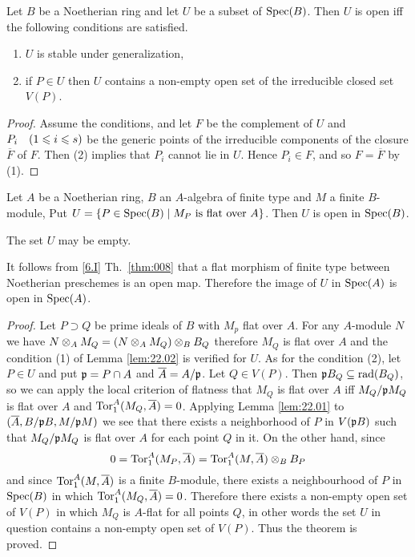 \documentclass[../main]{subfiles}
\begin{document}
\begin{parlemma}
\label{lem:22.02}
    Let $B$ be a Noetherian ring and let $U$ be a subset of $\operatorname{Spec}(B)$. Then $U$ is open iff the following conditions are satisfied.
    \begin{enumerate}[label=(\arabic*)]
    \item $U$ is stable under generalization,
    \item if $P \in U$ then $U$ contains a non-empty open set of the irreducible closed set $V(P)$.
    \end{enumerate}
\end{parlemma}
\begin{proof}
    Assume the conditions, and let $F$ be the complement of $U$ and \newline $P_i\for{1\le i\le s}$ be the generic points of the irreducible components of the closure $\overline{F}$ of $F$. Then (2) implies that $P_i$ cannot lie in $U$. Hence $P_i \in F$, and so $F=\overline{F}$ by (1). 
\end{proof}
\begin{theorem}
\label{thm:053}
    Let $A$ be a Noetherian ring, $B$ an $A$-algebra of finite type and $M$ a finite $B$-module, Put $U = \left\{P \in \operatorname{Spec}(B) \mid M_P \text{ is flat over } A\right\}$. Then $U$ is open in $\operatorname{Spec}(B)$. 
\end{theorem}
\begin{remark}
\label{rem:22.01}
    The set $U$ may be empty.
\end{remark}
\begin{remark}
\label{rem:22.02}
    It follows from \ref{6.I} Th.~\ref{thm:008} that a flat morphism of finite type between Noetherian preschemes is an open map. Therefore the image of $U$ in $\operatorname{Spec}(A)$ is open in $\operatorname{Spec}(A)$. 
\end{remark}
\begin{proof}
    Let $P\supset Q$ be prime ideals of $B$ with $M_p$ flat over $A$. For any $A$-module $N$ we have $N\otimes_A M_Q = \left(N\otimes_A M_Q\right)\otimes_B B_Q$ therefore $M_Q$ is flat over $A$ and the condition (1) of Lemma \ref{lem:22.02} is verified for $U$. As for the condition (2), let $P \in U$ and put $\mathfrak{p}=P\cap A$ and $\overline{A} = A/\mathfrak{p}$. Let $Q\in V(P)$. Then $\mathfrak{p}B_Q \subseteq \operatorname{rad}(B_Q)$, so we can apply the local criterion of flatness that $M_Q$ is flat over $A$ iff $M_Q/\mathfrak{p}M_Q$ is flat over $A$ and $\operatorname{Tor}^A_1(M_Q, \overline{A})=0$. Applying Lemma \ref{lem:22.01} to $(\overline{A}, B/\mathfrak{p}B, M/\mathfrak{p}M)$ we see that there exists a neighborhood of $P$ in $V(\mathfrak{p}B)$ such that $M_Q/\mathfrak{p}M_Q$ is flat over $A$ for each point $Q$ in it. On the other hand, since \[0 = \operatorname{Tor}^A_1(M_P,\overline{A})=\operatorname{Tor}^A_1(M,\overline{A})\otimes_B B_P\] and since $\operatorname{Tor}_1^A(M,\overline{A})$ is a finite $B$-module, there exists a neighbourhood of $P$ in $\operatorname{Spec}(B)$ in which $\operatorname{Tor}^A_1(M_Q, \overline{A})=0$. Therefore there exists a non-empty open set of $V(P)$ in which $M_Q$ is $A$-flat for all points $Q$, in other words the set $U$ in question contains a non-empty open set of $V(P)$. Thus the theorem is proved.
\end{proof}
\end{document}

